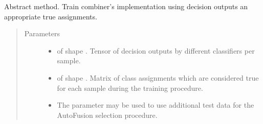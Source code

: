 \documentclass[letterpaper,10pt,english]{sphinxmanual}
\begin{document}
\begin{fulllineitems}
\begin{fulllineitems}
\end{fulllineitems}


\begin{fulllineitems}
\label{\detokenize{pusion.core.combiner:pusion.core.combiner.TrainableCombiner.train}}
\sphinxAtStartPar
Abstract method. Train combiner’s implementation using decision outputs an appropriate true assignments.
\begin{quote}\begin{description}
\item[{Parameters}] \leavevmode\begin{itemize}
\item {} 
\sphinxAtStartPar
{} \textendash{}  of shape .
Tensor of decision outputs by different classifiers per sample.

\item {} 
\sphinxAtStartPar
{} \textendash{}  of shape .
Matrix of class assignments which are considered true for each sample during the training procedure.

\item {} 
\sphinxAtStartPar
{} \textendash{} The  parameter may be used to use additional test data for the AutoFusion selection
procedure.

\end{itemize}

\end{description}\end{quote}

\end{fulllineitems}


\end{fulllineitems}

\end{document}
